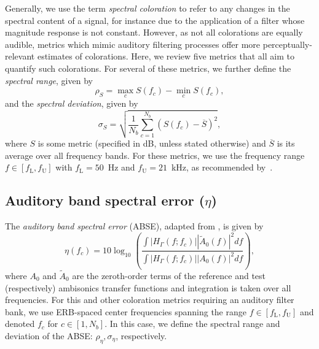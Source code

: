 Generally, we use the term \textit{spectral coloration} to refer to any changes in the spectral content of a signal, for instance due to the application of a filter whose magnitude response is not constant.
However, as not all colorations are equally audible, metrics which mimic auditory filtering processes offer more perceptually-relevant estimates of colorations.
Here, we review five metrics that all aim to quantify such colorations.
For several of these metrics, we further define the \textit{spectral range}, given by
\begin{equation}\label{eq:Spectral_Range}
\rho_S = \max_c S(f_c) - \min_c S(f_c),
\end{equation}
and the \textit{spectral deviation}, given by
\begin{equation}\label{eq:Spectral_Deviation}
\sigma_S = \sqrt{\frac{1}{N_b} \sum_{c = 1}^{N_b} \left( S(f_c) - \overline{S} \right)^2},
\end{equation}
where $S$ is some metric (specified in dB, unless stated otherwise) and $\overline{S}$ is its average over all frequency bands.
For these metrics, we use the frequency range $f \in [f_\text{L}, f_\text{U}]$ with $f_\text{L} = 50$~Hz and $f_\text{U} = 21$~kHz, as recommended by~\citet{Boren2015}.

\subsection{Auditory band spectral error (\texorpdfstring{$\eta$}{eta})}\label{sec:04_Auditory_Models:Coloration_Metrics:ABSE}
The \textit{auditory band spectral error} (ABSE), adapted from \citet[Eq.~(9)]{ScharerLindau2009}, is given by
\begin{equation}\label{eq:ABSE}
\eta(f_c) = 10 \log_{10} \left( \frac{\int |H_\Gamma(f;f_c)| |\tilde{A}_0(f)|^2 df}{\int |H_\Gamma(f;f_c)| |A_0(f)|^2 df} \right),
\end{equation}
where $A_0$ and $\tilde{A}_0$ are the zeroth-order terms of the reference and test (respectively) ambisonics transfer functions and integration is taken over all frequencies.
For this and other coloration metrics requiring an auditory filter bank, we use ERB-spaced center frequencies \citep{GlasbergMoore1990} spanning the range $f \in [f_\text{L}, f_\text{U}]$ and denoted $f_c$ for $c \in [1, N_b]$.
In this case, we define the spectral range and deviation of the ABSE: $\rho_\eta, \sigma_\eta$, respectively.

